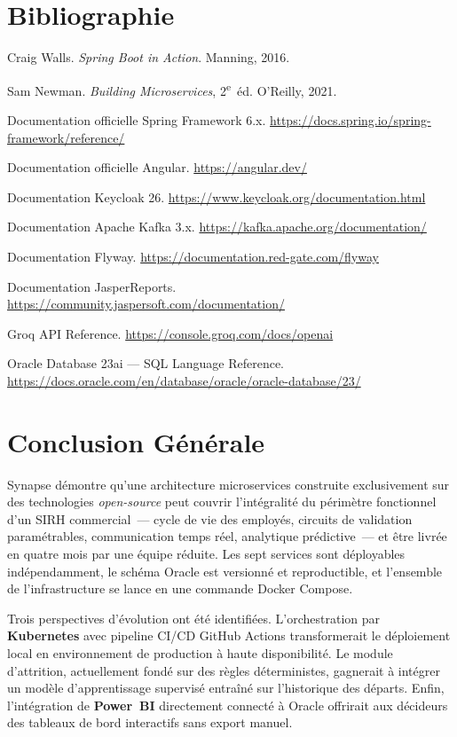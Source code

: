 \documentclass[12pt,a4paper,oneside]{report}
\begin{document}
\chapter*{Bibliographie}
\begin{enumerate}[label={[\arabic*]},leftmargin=*]
  \item Craig Walls. \textit{Spring Boot in Action}. Manning, 2016.
  \item Sam Newman. \textit{Building Microservices}, 2\textsuperscript{e}~éd. O'Reilly, 2021.
  \item Documentation officielle Spring Framework 6.x.
        \url{https://docs.spring.io/spring-framework/reference/}
  \item Documentation officielle Angular.
        \url{https://angular.dev/}
  \item Documentation Keycloak 26.
        \url{https://www.keycloak.org/documentation.html}
  \item Documentation Apache Kafka 3.x.
        \url{https://kafka.apache.org/documentation/}
  \item Documentation Flyway.
        \url{https://documentation.red-gate.com/flyway}
  \item Documentation JasperReports.
        \url{https://community.jaspersoft.com/documentation/}
  \item Groq API Reference.
        \url{https://console.groq.com/docs/openai}
  \item Oracle Database 23ai — SQL Language Reference.
        \url{https://docs.oracle.com/en/database/oracle/oracle-database/23/}
\end{enumerate}

\chapter*{Conclusion Générale}

Synapse démontre qu'une architecture microservices construite exclusivement sur
des technologies \textit{open-source} peut couvrir l'intégralité du périmètre
fonctionnel d'un SIRH commercial~--- cycle de vie des employés, circuits de
validation paramétrables, communication temps réel, analytique prédictive~---
et être livrée en quatre mois par une équipe réduite. Les sept services sont
déployables indépendamment, le schéma Oracle est versionné et reproductible,
et l'ensemble de l'infrastructure se lance en une commande Docker Compose.

Trois perspectives d'évolution ont été identifiées. L'orchestration par
\textbf{Kubernetes} avec pipeline CI/CD GitHub Actions transformerait le
déploiement local en environnement de production à haute disponibilité. Le
module d'attrition, actuellement fondé sur des règles déterministes, gagnerait
à intégrer un modèle d'apprentissage supervisé entraîné sur l'historique des
départs. Enfin, l'intégration de \textbf{Power~BI} directement connecté à Oracle
offrirait aux décideurs des tableaux de bord interactifs sans export manuel.
\end{document}

